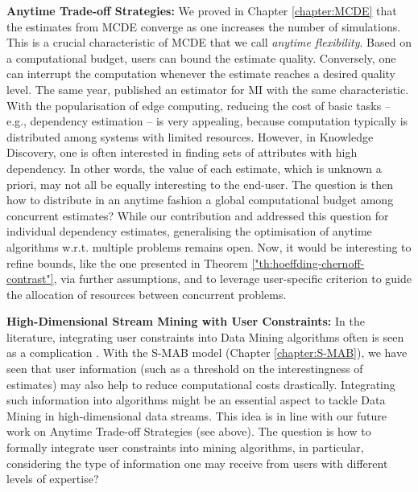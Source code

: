 \textbf{Anytime Trade-off Strategies:} We proved in Chapter \ref{chapter:MCDE} that the estimates from \gls{MCDE} converge as one increases the number of simulations. This is a crucial characteristic of \gls{MCDE} that we call \textit{anytime flexibility}. Based on a computational budget, users can bound the estimate quality. Conversely, one can interrupt the computation whenever the estimate reaches a desired quality level. The same year, \cite{DBLP:conf/edbt/VollmerB19} published an estimator for \gls{MI} with the same characteristic. With the popularisation of edge computing, reducing the cost of basic tasks -- e.g., dependency estimation -- is very appealing, because computation typically is distributed among systems with limited resources. However, in Knowledge Discovery, one is often interested in finding sets of attributes with high dependency. In other words, the value of each estimate, which is unknown a priori, may not all be equally interesting to the end-user. The question is then how to distribute in an anytime fashion a global computational budget among concurrent estimates? While our contribution \cite{DBLP:conf/ssdbm/FoucheB19} and  \cite{DBLP:conf/edbt/VollmerB19} addressed this question for individual dependency estimates, generalising the optimisation of anytime algorithms w.r.t. multiple problems remains open. Now, it would be interesting to refine bounds, like the one presented in Theorem \ref{"th:hoeffding-chernoff-contrast"}, via further assumptions, and to leverage user-specific criterion to guide the allocation of resources between concurrent problems.

\textbf{High-Dimensional Stream Mining with User Constraints:} In the literature, integrating user constraints into Data Mining algorithms often is seen as a complication \cite{DBLP:journals/computer/HanLN99}. With the \gls{S-MAB} model (Chapter \ref{chapter:S-MAB}), we have seen that user information (such as a threshold on the interestingness of estimates) may also help to reduce computational costs drastically. Integrating such information into algorithms might be an essential aspect to tackle Data Mining in high-dimensional data streams. This idea is in line with our future work on Anytime Trade-off Strategies (see above). The question is how to formally integrate user constraints into mining algorithms, in particular, considering the type of information one may receive from users with different levels of expertise?

